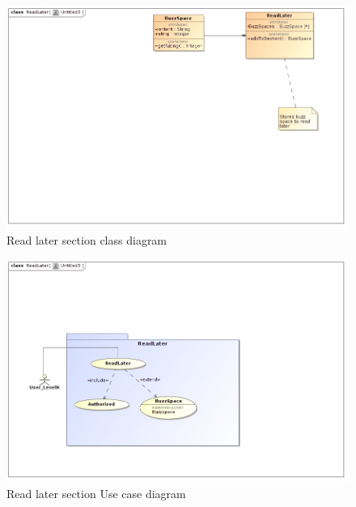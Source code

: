 \documentclass[11pt]{article}
\begin{document}
\begin{enumerate}
\begin{itemize}
\begin{itemize}
	\end{itemize}
\end{itemize}

\begin{figure}[H]	
\graphicspath{ {../Diagrams/sfiso/} }
    	\includegraphics[scale=0.5]{readC.jpg}
    	\caption{Read later section class diagram}
	\end{figure}

\begin{figure}[H]	
\graphicspath{ {../Diagrams/sfiso/} }
    	\includegraphics[scale=0.5]{read.jpg}
    	\caption{Read later section Use case diagram}
	\end{figure}
	

\end{enumerate}
\end{document}
